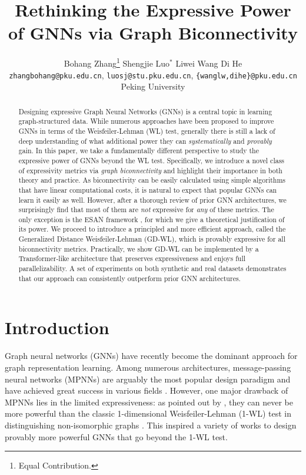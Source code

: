 \documentclass{article}
\title{Rethinking the Expressive Power of GNNs via Graph Biconnectivity}
\author{Bohang Zhang\thanks{Equal Contribution.} \qquad Shengjie Luo$^*$ \qquad Liwei Wang \qquad Di He\\
\small{\texttt{zhangbohang@pku.edu.cn}, \quad\texttt{luosj@stu.pku.edu.cn}, \quad
\texttt{\{wanglw,dihe\}@pku.edu.cn} }\\
Peking University
}
\begin{document}
\maketitle

\doparttoc 
\faketableofcontents 

\vspace{-5pt}

\begin{abstract}
Designing expressive Graph Neural Networks (GNNs) is a central topic in learning graph-structured data. While numerous approaches have been proposed to improve GNNs in terms of the Weisfeiler-Lehman (WL) test, generally there is still a lack of deep understanding of what additional power they can \emph{systematically} and \emph{provably} gain. In this paper, we take a fundamentally different perspective to study the expressive power of GNNs beyond the WL test. Specifically, we introduce a novel class of expressivity metrics via \emph{graph biconnectivity} and highlight their importance in both theory and practice. As biconnectivity can be easily calculated using simple algorithms that have linear computational costs, it is natural to expect that popular GNNs can learn it easily as well. However, after a thorough review of prior GNN architectures, we surprisingly find that most of them are \emph{not} expressive for \emph{any} of these metrics. The only exception is the ESAN framework , for which we give a theoretical justification of its power. We proceed to introduce a principled and more efficient approach, called the Generalized Distance Weisfeiler-Lehman (GD-WL), which is provably expressive for all biconnectivity metrics. Practically, we show GD-WL can be implemented by a Transformer-like architecture that preserves expressiveness and enjoys full parallelizability. A set of experiments on both synthetic and real datasets demonstrates that our approach can consistently outperform prior GNN architectures.
\end{abstract}

\vspace{-5pt}

\section{Introduction}
\label{sec:introduction}
Graph neural networks (GNNs) have recently become the dominant approach for graph representation learning. Among numerous architectures, message-passing neural networks (MPNNs) are arguably the most popular design paradigm and have achieved great success in various fields . However, one major drawback of MPNNs lies in the limited expressiveness: as pointed out by , they can never be more powerful than the classic 1-dimensional Weisfeiler-Lehman (1-WL) test in distinguishing non-isomorphic graphs . This inspired a variety of works to design provably more powerful GNNs that go beyond the 1-WL test.
\end{document}
